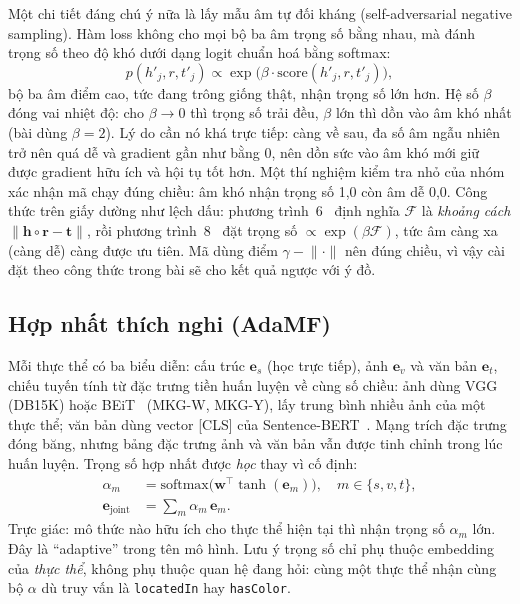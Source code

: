 \documentclass[conference]{IEEEtran}
\renewcommand{\hl}[1]{#1}
\renewcommand{\colorbox}[2]{#2}
\begin{document}
\hl{Một chi tiết đáng chú ý nữa là lấy mẫu âm tự đối kháng (self-adversarial negative sampling).}
Hàm loss không cho mọi bộ ba âm trọng số bằng nhau, mà đánh trọng số theo độ khó
dưới dạng logit chuẩn hoá bằng softmax:
\begin{equation}
  p(h'_j, r, t'_j) \propto \exp\!\big(\beta \cdot \mathrm{score}(h'_j, r, t'_j)\big),
\end{equation}
bộ ba âm điểm cao, tức đang trông giống thật, nhận trọng số lớn hơn. Hệ số $\beta$
đóng vai nhiệt độ: cho $\beta\to 0$ thì trọng số trải đều, $\beta$ lớn thì dồn vào
âm khó nhất (bài dùng $\beta=2$). Lý do cần nó khá trực tiếp: càng về sau, đa số âm
ngẫu nhiên trở nên quá dễ và gradient gần như bằng 0, nên dồn sức vào âm khó mới giữ
được gradient hữu ích và hội tụ tốt hơn. Một thí nghiệm kiểm tra nhỏ của nhóm xác nhận mã chạy đúng
chiều: âm khó nhận trọng số 1,0 còn âm dễ 0,0. \hl{Công thức} trên giấy dường như \hl{lệch dấu}: phương trình~6~\cite{adamfmat} định nghĩa $\mathcal{F}$ là \emph{khoảng cách} $\lVert\mathbf{h}\circ\mathbf{r}-\mathbf{t}\rVert$, rồi phương trình~8~\cite{adamfmat}
đặt trọng số $\propto\exp(\beta\mathcal{F})$, tức âm càng xa (càng dễ) càng được ưu tiên. \hl{Mã dùng điểm} \colorbox{yellow}{$\gamma-\lVert\cdot\rVert$}
\hl{nên đúng chiều, vì vậy cài đặt theo công thức trong bài sẽ cho kết quả ngược với ý đồ.}

\subsection{Hợp nhất thích nghi (AdaMF)}
Mỗi thực thể có ba biểu diễn: cấu trúc $\mathbf{e}_s$ (học trực tiếp), ảnh
$\mathbf{e}_v$ và văn bản $\mathbf{e}_t$, chiếu tuyến tính từ đặc trưng tiền huấn luyện về cùng số chiều: ảnh dùng VGG~\cite{vgg} (DB15K) hoặc BEiT~\cite{beit} (MKG-W, MKG-Y), lấy trung bình nhiều ảnh của một thực thể; văn bản dùng vector [CLS] của Sentence-BERT~\cite{sbert}. Mạng trích đặc trưng đóng băng, nhưng bảng đặc trưng ảnh và văn bản vẫn được tinh chỉnh trong lúc huấn luyện. Trọng số hợp nhất
được \emph{học} thay vì cố định:
\begin{align}
  \alpha_m &= \mathrm{softmax}\big(\mathbf{w}^\top \tanh(\mathbf{e}_m)\big),
  \quad m \in \{s, v, t\}, \\
  \mathbf{e}_{\text{joint}} &= \textstyle\sum_{m} \alpha_m \, \mathbf{e}_m.
\end{align}
Trực giác: mô thức nào hữu ích cho thực thể hiện tại thì nhận trọng số
$\alpha_m$ lớn. Đây là ``adaptive'' trong tên mô hình. Lưu ý trọng số chỉ phụ thuộc embedding
của \emph{thực thể}, không phụ thuộc quan hệ đang hỏi: cùng một thực thể nhận cùng bộ $\alpha$
dù truy vấn là \texttt{locatedIn} hay \texttt{hasColor}.
\end{document}
